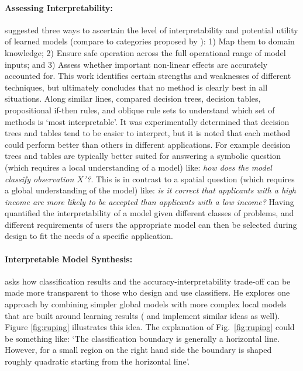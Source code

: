 \paragraph{Assessing Interpretability:}
\citet{Van_Belle2013-ph} suggested three ways to ascertain the level of interpretability and potential utility of learned models (compare to categories proposed by \citet{Lipton2016-ug}): 1) Map them to domain knowledge; 2) Ensure safe operation across the full operational range of model inputs; and 3) Assess whether important non-linear effects are accurately accounted for. This work identifies certain strengths and weaknesses of different techniques, but ultimately concludes that no method is clearly best in all situations. 
%
Along similar lines, \citet{Huysmans2011-th} compared decision trees, decision tables, propositional if-then rules, and oblique rule sets to understand which set of methods is `most interpretable'. It was experimentally determined that decision trees and tables tend to be easier to interpret, but it is noted that each method could perform better than others in different applications. For example decision trees and tables are typically better suited for answering a symbolic question (which requires a local understanding of a model) like: \emph{how does the model classify observation $X$'?}. This is in contrast to a spatial question (which requires a global understanding of the model) like: \emph{is it correct that applicants with a high income are more likely to be accepted than applicants with a low income?}
%
Having quantified the interpretability of a model given different classes of problems, and different requirements of users the appropriate model can then be selected during design to fit the needs of a specific application.

\paragraph{Interpretable Model Synthesis:}
\citet{Ruping2006-xj} asks how classification results and the accuracy-interpretability trade-off can be made more transparent to those who design and use classifiers. He explores one approach by combining simpler global models with more complex local models that are built around learning results (\citet{Otte2013-oo} and \citet{Ribeiro2016-uc} implement similar ideas as well). 
Figure \ref{fig:ruping} illustrates this idea. 
The explanation of Fig.~\ref{fig:ruping} could be something like: `The classification boundary is generally a horizontal line. However, for a small region on the right hand side the boundary is shaped roughly quadratic starting from the horizontal line'.

